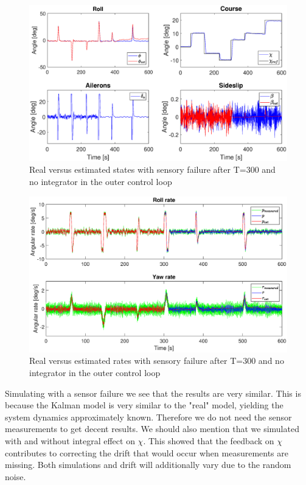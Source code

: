 \begin{figure}[h!]
    \centering
    \includegraphics[width=\textwidth]{figures/prob3g_no_integrator.eps}
    \caption{Real versus estimated states with sensory failure after T=300 and no integrator in the outer control loop}
    \label{fig:3g_no_int}
\end{figure}
\begin{figure}[h!]
    \centering
    \includegraphics[width=\textwidth]{figures/prob3g_rates_no_integrator.eps}
    \caption{Real versus estimated rates with sensory failure after T=300 and no integrator in the outer control loop}
    \label{fig:3g_rates_no_int}
\end{figure}

Simulating with a sensor failure we see that the results are very similar. This is because the Kalman model is very similar to the "real" model, yielding the system dynamics approximately known. Therefore we do not need the sensor measurements to get decent results. We should also mention that we simulated with and without integral effect on $\chi$. This showed that the feedback on $\chi$ contributes to correcting the drift that would occur when measurements are missing. Both simulations and drift will additionally vary due to the random noise. \\ 
